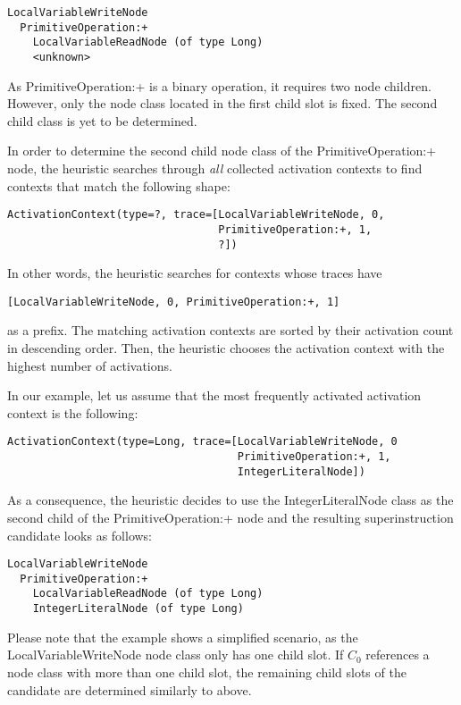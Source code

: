 \documentclass[10pt,a4paper]{article}
\begin{document}
\begin{verbatim}
LocalVariableWriteNode
  PrimitiveOperation:+
    LocalVariableReadNode (of type Long)
    <unknown>
\end{verbatim}

As \textsf{PrimitiveOperation:+} is a binary operation, it requires two node children. However, only the node class located in the first child slot is fixed. The second child class is yet to be determined.

In order to determine the second child node class of the \textsf{PrimitiveOperation:+} node, the heuristic searches through \emph{all} collected activation contexts to find contexts that match the following shape:

\begin{verbatim}
ActivationContext(type=?, trace=[LocalVariableWriteNode, 0,
                                 PrimitiveOperation:+, 1,
                                 ?])
\end{verbatim}

In other words, the heuristic searches for contexts whose traces have
\begin{verbatim}
[LocalVariableWriteNode, 0, PrimitiveOperation:+, 1]
\end{verbatim}
as a prefix. The matching activation contexts are sorted by their activation count in descending order. Then, the heuristic chooses the activation context with the highest number of activations.

In our example, let us assume that the most frequently activated activation context is the following:

\begin{verbatim}
ActivationContext(type=Long, trace=[LocalVariableWriteNode, 0
                                    PrimitiveOperation:+, 1,
                                    IntegerLiteralNode])
\end{verbatim}

As a consequence, the heuristic decides to use the \textsf{IntegerLiteralNode} class as the second child of the \textsf{PrimitiveOperation:+} node and the resulting superinstruction candidate looks as follows:

\begin{verbatim}
LocalVariableWriteNode
  PrimitiveOperation:+
    LocalVariableReadNode (of type Long)
    IntegerLiteralNode (of type Long)
\end{verbatim}

Please note that the example shows a simplified scenario, as the \textsf{LocalVariableWriteNode} node class only has one child slot. If $C_0$ references a node class with more than one child slot, the remaining child slots of the candidate are determined similarly to above.
\end{document}
